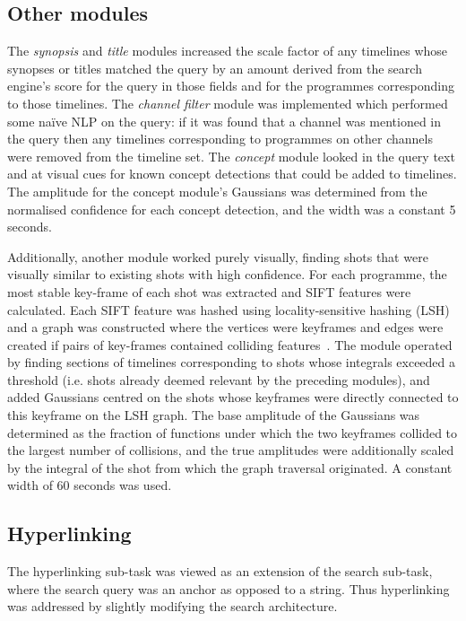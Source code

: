 \documentclass{../acm_proc_article-me11_tweaked}
\begin{document}

\subsection{Other modules}
The \emph{synopsis} and \emph{title} modules increased the scale factor of any timelines whose synopses or titles matched the query by an amount derived from the 
search engine's score for the query in those fields and for the programmes 
corresponding to those timelines. The \emph{channel filter} module was implemented which performed some naïve NLP on the query: if it was found that a channel was mentioned in the query then any 
timelines corresponding to programmes on other channels were removed from the 
timeline set. The \emph{concept} module looked in the query text and at visual cues for known concept detections that could be added to timelines. The amplitude for the concept 
module's Gaussians was determined from the normalised confidence for each 
concept detection, and the width was a constant 5 seconds. 

Additionally, another module worked purely visually, finding shots that were 
visually similar to existing shots with high confidence. For each programme, 
the most stable key-frame of each shot was extracted and SIFT features were 
calculated. Each SIFT feature was hashed using locality-sensitive hashing 
(LSH) and a graph was constructed where the vertices were keyframes and edges were created if pairs of key-frames contained colliding features~\cite{Hare:2013:TVP:2461466.2461514}. The module operated by finding sections of timelines corresponding to shots whose integrals exceeded a threshold (i.e. shots already deemed relevant by the preceding modules), and added Gaussians 
centred on the shots whose keyframes were directly connected to this keyframe 
on the LSH graph. The base amplitude of the Gaussians was determined as the 
fraction of functions under which the two keyframes collided to the largest 
number of collisions, and the true amplitudes were additionally scaled by the 
integral of the shot from which the graph traversal originated. A constant 
width of 60 seconds was used.

\subsection{Hyperlinking}
The hyperlinking sub-task was viewed as an extension of the search sub-task, 
where the search query was an anchor as opposed to a string. Thus hyperlinking 
was addressed by slightly modifying the search architecture. 
\end{document}
